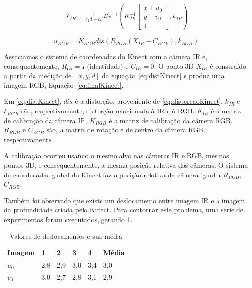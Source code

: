 \begin{gather} 
X_{IR} = \frac{1}{c_1 d + c_0}dis^{-1}\left ( K^{-1}_{IR}
\begin{bmatrix}
x+u_0\\ 
y+v_0\\ 
1
\end{bmatrix},k_{IR} 
\right )
\label{eq:distKinect}
\end{gather}

\begin{equation}
\label{eq:finalKinect}
u_{RGB} = K_{RGB} dis(R_{RGB}(X_{IR} - C_{RGB}),k_{RGB})
\end{equation}

Associamos o sistema de coordenadas do Kinect com a câmera IR e,
consequentemente, $R_{IR} = I$ (identidade) e $C_{IR} = 0$.  O ponto 3D $X_{IR}$
é construído a partir da medição de $[x,y,d]$ da equação~\ref{eq:distKinect} e
produz uma imagem RGB, Equação~\ref{eq:finalKinect}.

Em \ref{eq:distKinect}, $dis$ é a distorção, proveniente de
\ref{eq:distorcaoKinect}, $k_{IR}$ e $k_{RGB}$ são, respectivamente, distorção
relacionada à IR e à RGB.  $K_{IR}$ é a matriz de calibração da câmera IR,
$K_{RGB}$ é a matriz de calibração da câmera RGB. $R_{RGB}$ e $C_{RGB}$ são, a
matriz de rotação e de centro da câmera RGB, respectivamente.

A calibração ocorreu usando o mesmo alvo nas câmeras IR e RGB, mesmos pontos 3D,
e consequentemente, a mesma posição relativa das câmeras.  O sistema de
coordenadas global do Kinect faz a posição relativa da câmera igual a $R_{RGB}$,
$C_{RGB}$.

Também foi observado que existe um deslocamento entre imagem IR e a imagem da
profundidade criada pelo Kinect. Para contornar este problema, uma série de
experimentos foram executados, gerando \ref{tab:deslocamentoKinect}.

\begin{table}[!h]
\centering
\caption{Valores de deslocamentos e sua média}
\label{tab:deslocamentoKinect}
\begin{tabular}{|l|l|l|l|l|l|}
\hline
Imagem & 1   & 2   & 3   & 4   & Média \\ \hline
$u_0$  & 2,8 & 2,9 & 3,0 & 3,4 & 3,0   \\ \hline
$v_0$  & 3,0 & 2,7 & 2,8 & 3,1 & 2,9   \\ \hline
\end{tabular}
\end{table}

